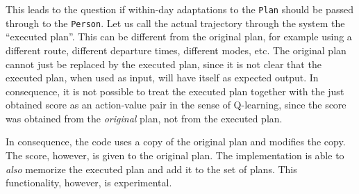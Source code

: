 
This leads to the question if within-day adaptations to the \lstinline$Plan$ should be passed through to the \lstinline$Person$.  Let us call the actual trajectory through the system the ``executed plan''.  This can be different from the original plan, for example using a different route, different departure times, different modes, etc.  The original plan cannot just be replaced by the executed plan, since it is not clear that the executed plan, when used as input, will have itself as expected output.  In consequence, it is not possible to treat the executed plan together with the just obtained score as an action-value pair in the sense of Q-learning, since the score was obtained from the \emph{original} plan, not from the executed plan.

In consequence, the code uses a copy of the original plan and modifies the copy. The score, however, is given to the original plan. The implementation is able to 
%
% 
\emph{also} memorize the executed plan and add it to the set of plans. This functionality, however, is experimental.




